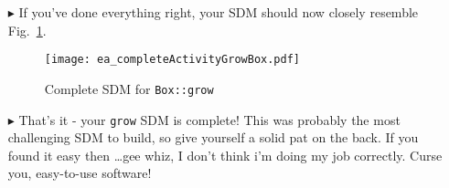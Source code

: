 \begin{itemize}
\item[$\blacktriangleright$]  If you've done everything right, your SDM should now closely resemble Fig.~\ref{fig:sdm_grow_5}. 


\begin{figure}[htbp]
\begin{center}
  \texttt{[image: ea\_completeActivityGrowBox.pdf]}
  \caption{Complete SDM for \texttt{Box::grow}}  
  \label{fig:sdm_grow_5}
\end{center}
\end{figure}

\item[$\blacktriangleright$]  That's it - your \texttt{grow} SDM is complete! This was probably the most challenging SDM to build, so give yourself a solid 
pat on the back. If you found it easy then \ldots gee whiz, I don't think i'm doing my job correctly. Curse you, easy-to-use software!

\end{itemize}
